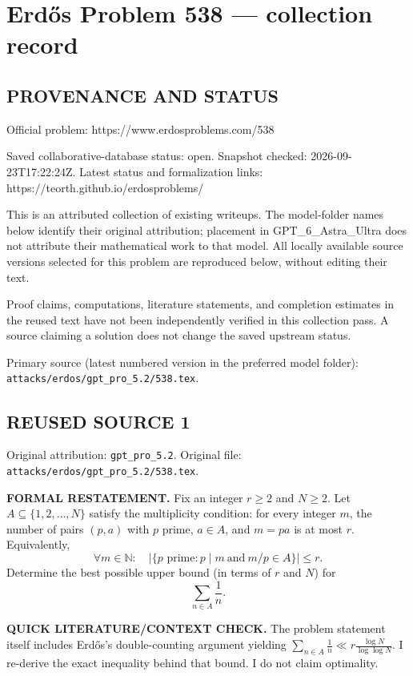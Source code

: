 \section*{Erd\H{o}s Problem 538 --- collection record}

\subsection*{PROVENANCE AND STATUS}
Official problem: https://www.erdosproblems.com/538

Saved collaborative-database status: open.
Snapshot checked: 2026-09-23T17:22:24Z.
Latest status and formalization links: https://teorth.github.io/erdosproblems/

This is an attributed collection of existing writeups. The model-folder names below identify their original attribution; placement in GPT\_6\_Astra\_Ultra does not attribute their mathematical work to that model. All locally available source versions selected for this problem are reproduced below, without editing their text.

Proof claims, computations, literature statements, and completion estimates in the reused text have not been independently verified in this collection pass. A source claiming a solution does not change the saved upstream status.

Primary source (latest numbered version in the preferred model folder): \texttt{attacks/erdos/gpt\_pro\_5.2/538.tex}.

\subsection*{REUSED SOURCE 1}
Original attribution: \texttt{gpt\_pro\_5.2}.
Original file: \texttt{attacks/erdos/gpt\_pro\_5.2/538.tex}.


\noindent\textbf{FORMAL RESTATEMENT.}
Fix an integer $r\ge 2$ and $N\ge 2$.
Let $A\subseteq\{1,2,\dots,N\}$ satisfy the multiplicity condition:
for every integer $m$, the number of pairs $(p,a)$ with $p$ prime, $a\in A$, and $m=p a$ is at most $r$.
Equivalently,
\[
\forall m\in\mathbb N:\quad \bigl|\{p\text{ prime}: p\mid m\ \text{and}\ m/p\in A\}\bigr|\le r.
\]
Determine the best possible upper bound (in terms of $r$ and $N$) for
\[
\sum_{n\in A}\frac1n.
\]

\noindent\textbf{QUICK LITERATURE/CONTEXT CHECK.}
The problem statement itself includes Erd\H{o}s's double-counting argument yielding
\(\sum_{n\in A} \frac{1}{n} \ll r \frac{\log N}{\log\log N}\).
I re-derive the exact inequality behind that bound. I do not claim optimality.

